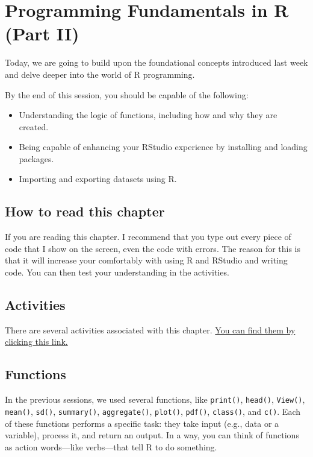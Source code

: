 \documentclass[
]{book}
\begin{document}
\chapter{\texorpdfstring{\textbf{Programming Fundamentals in R (Part II)}}{Programming Fundamentals in R (Part II)}}\label{programming2}

Today, we are going to build upon the foundational concepts introduced last week and delve deeper into the world of R programming.

By the end of this session, you should be capable of the following:

\begin{itemize}
\item
  Understanding the logic of functions, including how and why they are created.
\item
  Being capable of enhancing your RStudio experience by installing and loading packages.
\item
  Importing and exporting datasets using R.
\end{itemize}

\section{How to read this chapter}\label{how-to-read-this-chapter-1}

If you are reading this chapter. I recommend that you type out every piece of code that I show on the screen, even the code with errors. The reason for this is that it will increase your comfortably with using R and RStudio and writing code. You can then test your understanding in the activities.

\section{Activities}\label{activities-1}

There are several activities associated with this chapter. \href{https://ryandonovan.quarto.pub/week-3---activities-fb08/}{You can find them by clicking this link.}

\section{Functions}\label{functions}

In the previous sessions, we used several functions, like \texttt{print()}, \texttt{head()}, \texttt{View()}, \texttt{mean()}, \texttt{sd()}, \texttt{summary()}, \texttt{aggregate()}, \texttt{plot()}, \texttt{pdf()}, \texttt{class()}, and \texttt{c()}. Each of these functions performs a specific task: they take input (e.g., data or a variable), process it, and return an output. In a way, you can think of functions as action words---like verbs---that tell R to do something.
\end{document}
